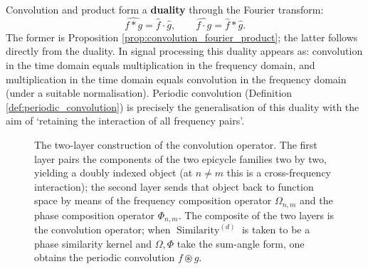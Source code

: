 \begin{remark}\label{rem:convolution_product_duality}
Convolution and product form a \textbf{duality} through the Fourier transform:
\[
\widehat{f * g} = \widehat{f} \cdot \widehat{g}, \qquad \widehat{f \cdot g} = \widehat{f} * \widehat{g}.
\]
The former is Proposition \ref{prop:convolution_fourier_product}; the latter follows directly from the duality. In signal processing this duality appears as: convolution in the time domain equals multiplication in the frequency domain, and multiplication in the time domain equals convolution in the frequency domain (under a suitable normalisation). Periodic convolution (Definition \ref{def:periodic_convolution}) is precisely the generalisation of this duality with the aim of `retaining the interaction of all frequency pairs'.
\end{remark}

\begin{figure}[htbp]
\centering
{}
\caption{The two-layer construction of the convolution operator. The first layer pairs the components of the two epicycle families two by two, yielding a doubly indexed object (at $n\neq m$ this is a cross-frequency interaction); the second layer sends that object back to function space by means of the frequency composition operator $\Omega_{n,m}$ and the phase composition operator $\Phi_{n,m}$. The composite of the two layers is the convolution operator; when $\operatorname{Similarity}^{(d)}$ is taken to be a phase similarity kernel and $\Omega,\Phi$ take the sum-angle form, one obtains the periodic convolution $f\circledast g$.}
\label{fig:convolution_two_layers}
\end{figure}

